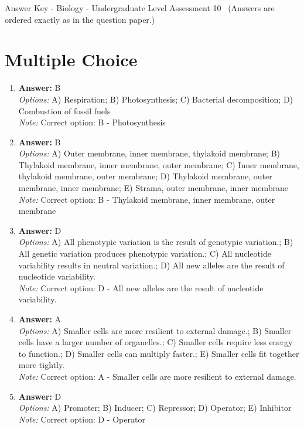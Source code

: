 \documentclass[12pt]{article}
\begin{document}
\begin{center}
Answer Key - Biology - Undergraduate Level Assessment 10 \
\small (Answers are ordered exactly as in the question paper.)
\end{center}

\section*{Multiple Choice}
\begin{enumerate}[label=\arabic*.]
\item \textbf{Answer:} B
\\ \textit{Options:} A) Respiration; B) Photosynthesis; C) Bacterial decomposition; D) Combustion of fossil fuels
\\ \textit{Note:} Correct option: B - Photosynthesis
\item \textbf{Answer:} B
\\ \textit{Options:} A) Outer membrane, inner membrane, thylakoid membrane; B) Thylakoid membrane, inner membrane, outer membrane; C) Inner membrane, thylakoid membrane, outer membrane; D) Thylakoid membrane, outer membrane, inner membrane; E) Strama, outer membrane, inner membrane
\\ \textit{Note:} Correct option: B - Thylakoid membrane, inner membrane, outer membrane
\item \textbf{Answer:} D
\\ \textit{Options:} A) All phenotypic variation is the result of genotypic variation.; B) All genetic variation produces phenotypic variation.; C) All nucleotide variability results in neutral variation.; D) All new alleles are the result of nucleotide variability.
\\ \textit{Note:} Correct option: D - All new alleles are the result of nucleotide variability.
\item \textbf{Answer:} A
\\ \textit{Options:} A) Smaller cells are more resilient to external damage.; B) Smaller cells have a larger number of organelles.; C) Smaller cells require less energy to function.; D) Smaller cells can multiply faster.; E) Smaller cells fit together more tightly.
\\ \textit{Note:} Correct option: A - Smaller cells are more resilient to external damage.
\item \textbf{Answer:} D
\\ \textit{Options:} A) Promoter; B) Inducer; C) Repressor; D) Operator; E) Inhibitor
\\ \textit{Note:} Correct option: D - Operator
\end{enumerate}
\end{document}
